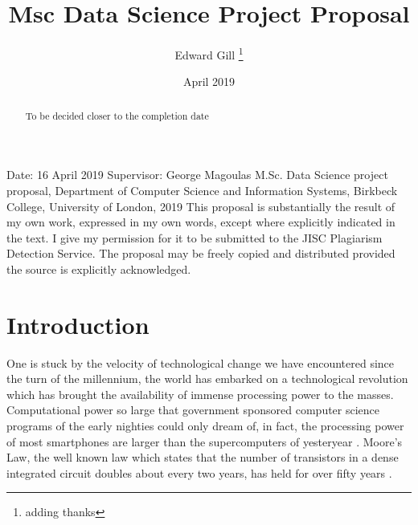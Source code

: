 \documentclass[12pt, a4paper]{article}
\title{Msc Data Science Project Proposal}
\author{Edward Gill \thanks{adding thanks}}
\date{April 2019}
\begin{document}
\maketitle

\begin{abstract}
To be decided closer to the completion date
\end{abstract}
Date: 16 April 2019
Supervisor: George Magoulas
M.Sc. Data Science project proposal, Department of Computer Science and Information Systems, Birkbeck College, University of London, 2019
This proposal is substantially the result of my own work, expressed in my own words, except where explicitly indicated in the text. I give my permission for it to be submitted to the JISC Plagiarism Detection Service.
The proposal may be freely copied and distributed provided the source is explicitly acknowledged.


\clearpage
\tableofcontents

\clearpage


\section{Introduction}

One is stuck by the velocity of technological change we have encountered since the turn of the millennium, the world has embarked on a technological revolution which has brought the availability of immense processing power to the masses. Computational power so large that government sponsored computer science programs of the early nighties could only dream of, in fact, the processing power of most smartphones are larger than the supercomputers of yesteryear \cite{supercomp}.
\newline Moore's Law, the well known law which states that the number of transistors in a dense integrated circuit doubles about every two years, has held for over fifty years \cite{MacK2011}. 
\end{document}
